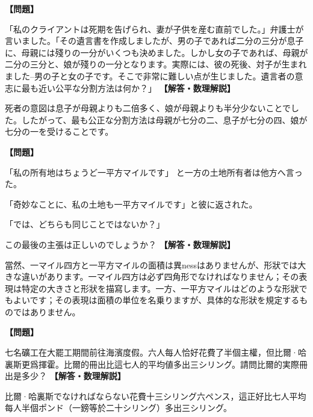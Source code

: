 \documentclass[10pt,a4paper,oneside,openany]{ltjsbook}
\begin{document}
\begin{tcolorbox}[colback=softblue,colframe=primaryblue,title=\textbf{第 123 問：法的な難題 （原題: A LEGAL DIFFICULTY.）},arc=2mm,boxrule=1pt,breakable]
\textbf{【問題】}\par\vspace{0.3em}
「私のクライアントは死期を告げられ、妻が子供を産む直前でした。」弁護士が言いました。「その遺言書を作成しましたが、男の子であれば二分の三分が息子に、母親には殘りの一分がいくつも決めました。しかし女の子であれば、母親が二分の三分と、娘が殘りの一分となります。実際には、彼の死後、対子が生まれました--男の子と女の子です。そこで非常に難しい点が生じました。遺言者の意志に最も近い公平な分割方法は何か？」
\tcblower
\textbf{【解答・数理解説】}\par\vspace{0.3em}
死者の意図は息子が母親よりも二倍多く、娘が母親よりも半分少ないことでした。したがって、最も公正な分割方法は母親が七分の二、息子が七分の四、娘が七分の一を受けることです。
\end{tcolorbox}

\begin{tcolorbox}[colback=softblue,colframe=primaryblue,title=\textbf{第 124 問：A QUESTION OF DEFINITION.},arc=2mm,boxrule=1pt,breakable]
\textbf{【問題】}\par\vspace{0.3em}
「私の所有地はちょうど一平方マイルです」
と一方の土地所有者は他方へ言った。

「奇妙なことに、私の土地も一平方マイルです」と彼に返された。

「では、どちらも同じことではないか？」

この最後の主張は正しいのでしょうか？
\tcblower
\textbf{【解答・数理解説】}\par\vspace{0.3em}
當然、一マイル四方と一平方マイルの面積は異nessはありませんが、形狀では大きな違いがあります。一マイル四方は必ず四角形でなければなりません；その表現は特定の大きさと形狀を描寫します。一方、一平方マイルはどのような形狀でもよいです；その表現は面積の単位を名乗りますが、具体的な形狀を規定するものではありません。
\end{tcolorbox}

\begin{tcolorbox}[colback=softblue,colframe=primaryblue,title=\textbf{第 125 問：礦夫們的假期 （原題: THE MINERS' HOLIDAY.）},arc=2mm,boxrule=1pt,breakable]
\textbf{【問題】}\par\vspace{0.3em}
七名礦工在大罷工期間前往海濱度假。六人每人恰好花費了半個主權，但比爾·哈裏斯更爲揮霍。比爾的冊出比這七人的平均値多出三シリング。請問比爾的実際冊出是多少？
\tcblower
\textbf{【解答・数理解説】}\par\vspace{0.3em}
比爾·哈裏斯でなければならない花費十三シリング六ペンス，這正好比七人平均每人半個ポンド（一鎊等於二十シリング）多出三シリング。
\end{tcolorbox}
\end{document}
